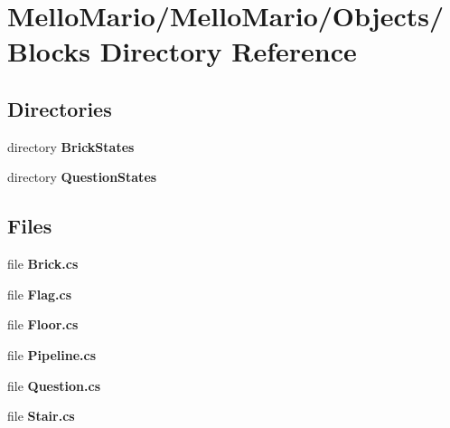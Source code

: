 \section{Mello\+Mario/\+Mello\+Mario/\+Objects/\+Blocks Directory Reference}
\label{dir_14330487b678633e358454e336df779b}
\subsection*{Directories}
\begin{DoxyCompactItemize}
\item 
directory \textbf{ Brick\+States}
\item 
directory \textbf{ Question\+States}
\end{DoxyCompactItemize}
\subsection*{Files}
\begin{DoxyCompactItemize}
\item 
file \textbf{ Brick.\+cs}
\item 
file \textbf{ Flag.\+cs}
\item 
file \textbf{ Floor.\+cs}
\item 
file \textbf{ Pipeline.\+cs}
\item 
file \textbf{ Question.\+cs}
\item 
file \textbf{ Stair.\+cs}
\end{DoxyCompactItemize}
